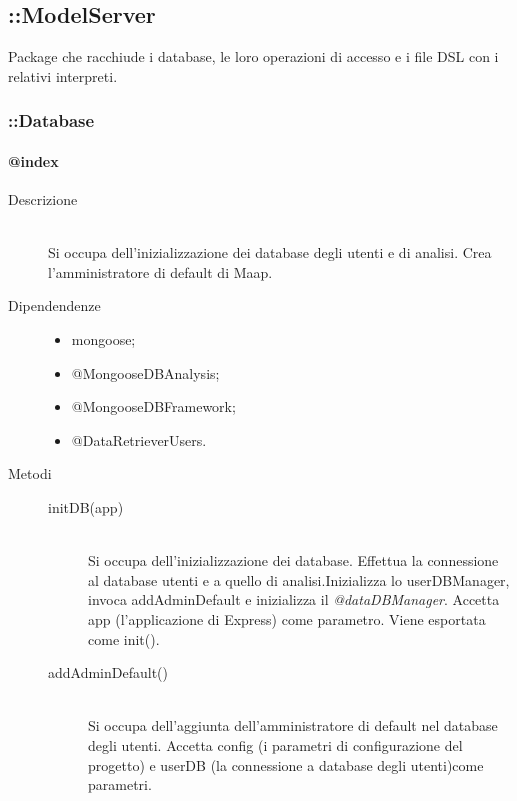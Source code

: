 \subsection{::ModelServer}
Package che racchiude i database, le loro operazioni di accesso e i file 
DSL con i relativi interpreti.

\subsubsection{::Database}
\paragraph{@index}
\begin{description}
 \item[Descrizione] \hfill \\
 Si occupa dell'inizializzazione dei database degli utenti e di analisi. Crea l'amministratore di default di Maap.
 \item[Dipendendenze] \hfill
   \begin{itemize}
   \item mongoose;
   \item @MongooseDBAnalysis;
   \item @MongooseDBFramework;
   \item @DataRetrieverUsers.
   \end{itemize}
 \item[Metodi] \hfill
 \begin{description}
 \item[initDB(app)] \hfill \\
 Si occupa dell'inizializzazione dei database. Effettua la connessione al database utenti e a quello di analisi.Inizializza lo userDBManager, invoca addAdminDefault e inizializza il \textit{@dataDBManager}. Accetta app (l'applicazione di Express) come parametro. Viene esportata come init().
  \item[addAdminDefault()] \hfill \\
  Si occupa dell'aggiunta dell'amministratore di default nel database degli utenti. Accetta config (i parametri di configurazione del progetto) e userDB (la connessione a database degli utenti)come parametri.
 \end{description}
\end{description}

